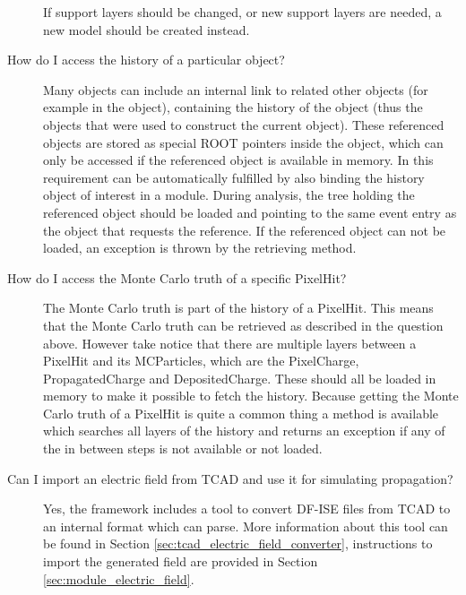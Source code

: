 \begin{description}
If support layers should be changed, or new support layers are needed, a new model should be created instead.
\item[How do I access the history of a particular object?]
Many objects can include an internal link to related other objects (for example  in the  object), containing the history of the object (thus the objects that were used to construct the current object).
These referenced objects are stored as special ROOT pointers inside the object, which can only be accessed if the referenced object is available in memory.
In \apsq this requirement can be automatically fulfilled by also binding the history object of interest in a module.
During analysis, the tree holding the referenced object should be loaded and pointing to the same event entry as the object that requests the reference.
If the referenced object can not be loaded, an exception is thrown by the retrieving method.
\item[How do I access the Monte Carlo truth of a specific PixelHit?]
The Monte Carlo truth is part of the history of a PixelHit.
This means that the Monte Carlo truth can be retrieved as described in the question above.
However take notice that there are multiple layers between a PixelHit and its MCParticles, which are the PixelCharge, PropagatedCharge and DepositedCharge.
These should all be loaded in memory to make it possible to fetch the history.
Because getting the Monte Carlo truth of a PixelHit is quite a common thing a  method is available which searches all layers of the history and returns an exception if any of the in between steps is not available or not loaded.
\item[Can I import an electric field from TCAD and use it for simulating propagation?]
Yes, the framework includes a tool to convert DF-ISE files from TCAD to an internal format which \apsq can parse.
More information about this tool can be found in Section \ref{sec:tcad_electric_field_converter}, instructions to import the generated field are provided in Section \ref{sec:module_electric_field}.
\end{description}

